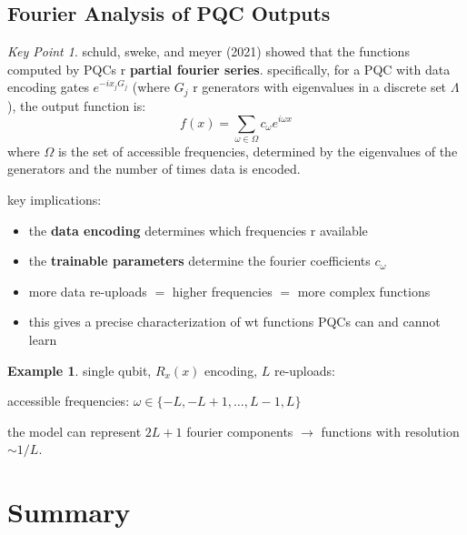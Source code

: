 \documentclass[11pt,a4paper]{article}
\theoremstyle{definition}
\newtheorem{example}{Example}[section]
\theoremstyle{remark}
\newtheorem*{keypoint}{Key Point}
\begin{document}
\subsection{Fourier Analysis of PQC Outputs}

\begin{keypoint}
schuld, sweke, and meyer (2021) showed that the functions computed by PQCs r \textbf{partial fourier series}. specifically, for a PQC with data encoding gates $e^{-ix_j G_j}$ (where $G_j$ r generators with eigenvalues in a discrete set $\Lambda$), the output function is:
\[
f(x) = \sum_{\omega \in \Omega} c_\omega e^{i\omega x}
\]
where $\Omega$ is the set of accessible frequencies, determined by the eigenvalues of the generators and the number of times data is encoded.

key implications:
\begin{itemize}
    \item the \textbf{data encoding} determines which frequencies r available
    \item the \textbf{trainable parameters} determine the fourier coefficients $c_\omega$
    \item more data re-uploads $=$ higher frequencies $=$ more complex functions
    \item this gives a precise characterization of wt functions PQCs can and cannot learn
\end{itemize}
\end{keypoint}

\begin{example}
single qubit, $R_x(x)$ encoding, $L$ re-uploads:

accessible frequencies: $\omega \in \{-L, -L+1, \ldots, L-1, L\}$

the model can represent $2L + 1$ fourier components $\to$ functions with resolution $\sim 1/L$.
\end{example}

\section{Summary}
\end{document}
